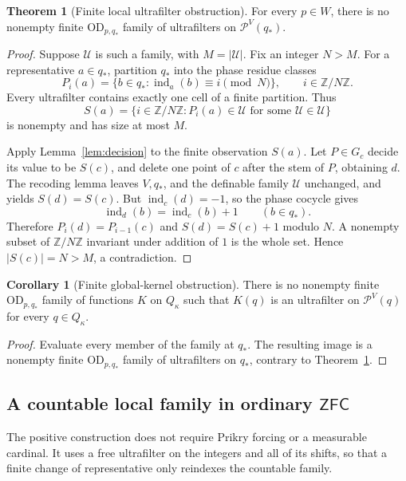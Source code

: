\documentclass[11pt,letterpaper]{article}
\theoremstyle{definition}
\newtheorem{theorem}[definition]{Theorem}
\newtheorem{corollary}[definition]{Corollary}
\numberwithin{equation}{section}
\newcommand{\ZFC}{\mathsf{ZFC}}
\newcommand{\OD}{\mathrm{OD}}
\newcommand{\Pow}{\mathcal P}
\newcommand{\ch}{\operatorname{ind}}
\begin{document}
\begin{theorem}[Finite local ultrafilter obstruction]\label{thm:nofiniteuf}
For every $p\in W$, there is no nonempty finite $\OD_{p,q_*}$ family of
ultrafilters on $\Pow^V(q_*)$.
\end{theorem}

\begin{proof}
Suppose $\mathscr U$ is such a family, with $M=|\mathscr U|$. Fix an integer
$N>M$. For a representative $a\in q_*$, partition $q_*$ into the phase
residue classes
\[
             P_i(a)=\{b\in q_*:\ch_a(b)\equiv i\pmod N\},
                         \qquad i\in\mathbb Z/N\mathbb Z.
\]
Every ultrafilter contains exactly one cell of a finite partition. Thus
\[
 S(a)=\{i\in\mathbb Z/N\mathbb Z:
                  P_i(a)\in\mathcal U\text{ for some }\mathcal U\in\mathscr U\}
\]
is nonempty and has size at most $M$.

Apply Lemma~\ref{lem:decision} to the finite observation $S(a)$. Let
$P\in G_c$ decide its value to be $S(c)$, and delete one point of $c$
after the stem of $P$, obtaining $d$. The recoding lemma leaves $V,q_*$,
and the definable family $\mathscr U$ unchanged, and yields $S(d)=S(c)$.
But $\ch_c(d)=-1$, so the phase cocycle gives
\[
                         \ch_d(b)=\ch_c(b)+1
                                  \qquad(b\in q_*).
\]
Therefore $P_i(d)=P_{i-1}(c)$ and $S(d)=S(c)+1$ modulo $N$. A nonempty
subset of $\mathbb Z/N\mathbb Z$ invariant under addition of $1$ is the
whole set. Hence $|S(c)|=N>M$, a contradiction.
\end{proof}

\begin{corollary}[Finite global-kernel obstruction]\label{cor:nofinitekernels}
There is no nonempty finite $\OD_{p,q_*}$ family of functions $K$ on
$Q_\kappa$ such that $K(q)$ is an ultrafilter on $\Pow^V(q)$ for every
$q\in Q_\kappa$.
\end{corollary}

\begin{proof}
Evaluate every member of the family at $q_*$. The resulting image is a
nonempty finite $\OD_{p,q_*}$ family of ultrafilters on $q_*$, contrary to
Theorem~\ref{thm:nofiniteuf}.
\end{proof}

\subsection{A countable local family in ordinary $\ZFC$}

The positive construction does not require Prikry forcing or a measurable
cardinal. It uses a free ultrafilter on the integers and all of its shifts,
so that a finite change of representative only reindexes the countable
family.
\end{document}

